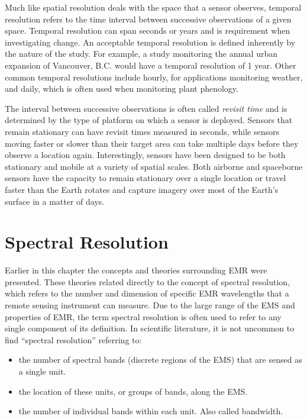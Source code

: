 \documentclass[
]{book}
\begin{document}
Much like spatial resolution deals with the space that a sensor
observes, temporal resolution refers to the time interval between
successive observations of a given space. Temporal resolution can span
seconds or years and is requirement when investigating change. An
acceptable temporal resolution is defined inherently by the nature of
the study. For example, a study monitoring the annual urban expansion of
Vancouver, B.C. would have a temporal resolution of 1 year. Other common
temporal resolutions include hourly, for applications monitoring
weather, and daily, which is often used when monitoring plant phenology.

The interval between successive observations is often called \emph{revisit
time} and is determined by the type of platform on which a sensor is
deployed. Sensors that remain stationary can have revisit times measured
in seconds, while sensors moving faster or slower than their target area
can take multiple days before they observe a location again.
Interestingly, sensors have been designed to be both stationary and
mobile at a variety of spatial scales. Both airborne and spaceborne
sensors have the capacity to remain stationary over a single location or
travel faster than the Earth rotates and capture imagery over most of
the Earth's surface in a matter of days.

\hypertarget{spectral-resolution}{%
\section{Spectral Resolution}\label{spectral-resolution}}

Earlier in this chapter the concepts and theories surrounding EMR were
presented. These theories related directly to the concept of spectral
resolution, which refers to the number and dimension of specific EMR
wavelengths that a remote sensing instrument can measure. Due to the
large range of the EMS and properties of EMR, the term spectral
resolution is often used to refer to any single component of its
definition. In scientific literature, it is not uncommon to find
``spectral resolution'' referring to:

\begin{itemize}
\item
  the number of spectral bands (discrete regions of the EMS) that are
  sensed as a single unit.
\item
  the location of these units, or groups of bands, along the EMS.
\item
  the number of individual bands within each unit. Also called
  bandwidth.
\end{itemize}
\end{document}

